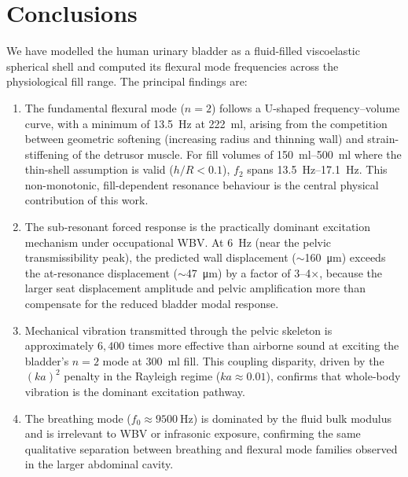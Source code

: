 \section{Conclusions}
\label{sec:conclusion}

We have modelled the human urinary bladder as a fluid-filled viscoelastic
spherical shell and computed its flexural mode frequencies across the
physiological fill range.  The principal findings are:

\begin{enumerate}
  \item The fundamental flexural mode ($n = 2$) follows a U-shaped
    frequency--volume curve, with a minimum of \SI{13.5}{\hertz} at
    \SI{222}{\milli\litre}, arising from the competition between geometric
    softening (increasing radius and thinning wall) and strain-stiffening of
    the detrusor muscle.  For fill volumes of
    \SIrange{150}{500}{\milli\litre} where the thin-shell assumption is
    valid ($h/R < 0.1$), $f_2$ spans \SIrange{13.5}{17.1}{\hertz}.
    This non-monotonic, fill-dependent resonance behaviour is the central
    physical contribution of this work.

  \item The sub-resonant forced response is the practically dominant
    excitation mechanism under occupational WBV.  At \SI{6}{\hertz}
    (near the pelvic transmissibility peak), the predicted wall displacement
    ($\sim$\SI{160}{\micro\metre}) exceeds the at-resonance displacement
    ($\sim$\SI{47}{\micro\metre}) by a factor of 3--4$\times$, because the
    larger seat displacement amplitude and pelvic amplification more than
    compensate for the reduced bladder modal response.

  \item Mechanical vibration transmitted through the pelvic skeleton is
    approximately $6{,}400$ times more effective than airborne sound at
    exciting the bladder's $n = 2$ mode at \SI{300}{\milli\litre} fill.
    This coupling disparity, driven by the $(ka)^2$ penalty in the Rayleigh
    regime ($ka \approx 0.01$), confirms that whole-body vibration is the
    dominant excitation pathway.

  \item The breathing mode ($f_0 \approx \SI{9500}{\hertz}$) is dominated by
    the fluid bulk modulus and is irrelevant to WBV or infrasonic exposure,
    confirming the same qualitative separation between breathing and flexural
    mode families observed in the larger abdominal cavity.
\end{enumerate}

